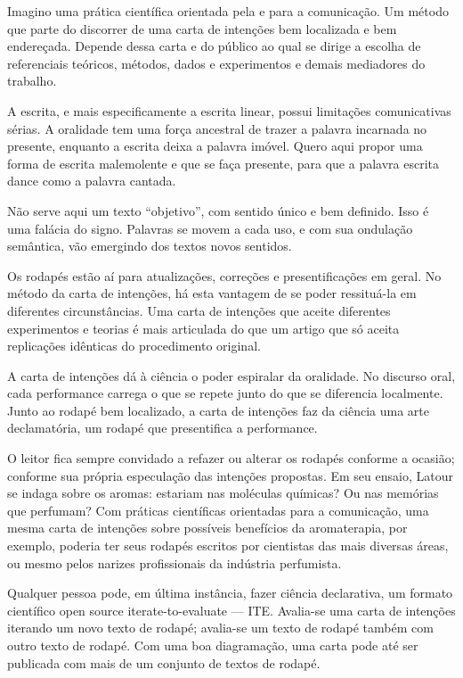 Imagino uma prática científica orientada pela e para a comunicação. Um método que parte do discorrer de uma carta de intenções bem localizada e bem endereçada. Depende dessa carta e do público ao qual se dirige a escolha de referenciais teóricos, métodos, dados e experimentos e demais mediadores do trabalho.

A escrita, e mais especificamente a escrita linear, possui limitações comunicativas sérias. A oralidade tem uma força ancestral de trazer a palavra incarnada no presente, enquanto a escrita deixa a palavra imóvel. Quero aqui propor uma forma de escrita malemolente e que se faça presente, para que a palavra escrita dance como a palavra cantada.

Não serve aqui um texto \enquote{objetivo}, com sentido único e bem definido. Isso é uma falácia do signo. Palavras se movem a cada uso, e com sua ondulação semântica, vão emergindo dos textos novos sentidos.

Os rodapés estão aí para atualizações, correções e presentificações em geral. No método da carta de intenções, há esta vantagem de se poder ressituá-la em diferentes circunstâncias. Uma carta de intenções que aceite diferentes experimentos e teorias é mais articulada do que um artigo que só aceita replicações idênticas do procedimento original.

A carta de intenções dá à ciência o poder espiralar da oralidade. No discurso oral, cada performance carrega o que se repete junto do que se diferencia localmente. Junto ao rodapé bem localizado, a carta de intenções faz da ciência uma arte declamatória, um rodapé que presentifica a performance.

O leitor fica sempre convidado a refazer ou alterar os rodapés conforme a ocasião; conforme sua própria especulação das intenções propostas. Em seu ensaio, Latour se indaga sobre os aromas: estariam nas moléculas químicas? Ou nas memórias que perfumam? Com práticas científicas orientadas para a comunicação, uma mesma carta de intenções sobre possíveis benefícios da aromaterapia, por exemplo, poderia ter seus rodapés escritos por cientistas das mais diversas áreas, ou mesmo pelos narizes profissionais da indústria perfumista.

Qualquer pessoa pode, em última instância, fazer ciência declarativa, um formato científico open source iterate-to-evaluate --- ITE. Avalia-se uma carta de intenções iterando um novo texto de rodapé; avalia-se um texto de rodapé também com outro texto de rodapé. Com uma boa diagramação, uma carta pode até ser publicada com mais de um conjunto de textos de rodapé.

